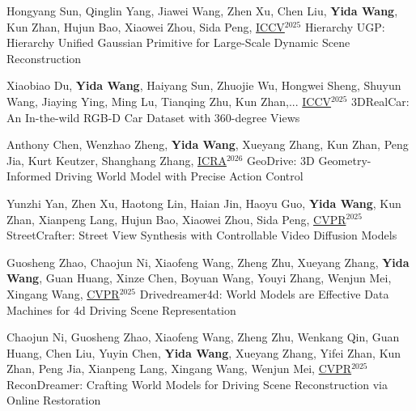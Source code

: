 \begin{cventries}
\begin{enumerate}[label={[\arabic*]}, leftmargin=*]
\item
\cvpublication
{Hongyang Sun, Qinglin Yang, Jiawei Wang, Zhen Xu, Chen Liu, \textbf{Yida Wang}, Kun Zhan, Hujun Bao, Xiaowei Zhou, Sida Peng, \underline{ICCV}$^{2025}$} %
{Hierarchy UGP: Hierarchy Unified Gaussian Primitive for Large-Scale Dynamic Scene Reconstruction} %
{} %
{} %

\item
\cvpublication
{Xiaobiao Du, \textbf{Yida Wang}, Haiyang Sun, Zhuojie Wu, Hongwei Sheng, Shuyun Wang, Jiaying Ying, Ming Lu, Tianqing Zhu, Kun Zhan,...  \underline{ICCV}$^{2025}$} %
{3DRealCar: An In-the-wild RGB-D Car Dataset with 360-degree Views} %
{} %
{} %

\item
\cvpublication
{Anthony Chen, Wenzhao Zheng, \textbf{Yida Wang}, Xueyang Zhang, Kun Zhan, Peng Jia, Kurt Keutzer, Shanghang Zhang, \underline{ICRA}$^{2026}$} %
{GeoDrive: 3D Geometry-Informed Driving World Model with Precise Action Control} %
{} %
{} %

\item
\cvpublication
{Yunzhi Yan, Zhen Xu, Haotong Lin, Haian Jin, Haoyu Guo, \textbf{Yida Wang}, Kun Zhan, Xianpeng Lang, Hujun Bao, Xiaowei Zhou, Sida Peng, \underline{CVPR}$^{2025}$} %
{StreetCrafter: Street View Synthesis with Controllable Video Diffusion Models} %
{} %
{} %

\item
\cvpublication
{Guosheng Zhao, Chaojun Ni, Xiaofeng Wang, Zheng Zhu, Xueyang Zhang, \textbf{Yida Wang}, Guan Huang, Xinze Chen, Boyuan Wang, Youyi Zhang, Wenjun Mei, Xingang Wang, \underline{CVPR}$^{2025}$} %
{Drivedreamer4d: World Models are Effective Data Machines for 4d Driving Scene Representation} %
{} %
{} %

\item
\cvpublication
{Chaojun Ni, Guosheng Zhao, Xiaofeng Wang, Zheng Zhu, Wenkang Qin, Guan Huang, Chen Liu, Yuyin Chen, \textbf{Yida Wang}, Xueyang Zhang, Yifei Zhan, Kun Zhan, Peng Jia, Xianpeng Lang, Xingang Wang, Wenjun Mei, \underline{CVPR}$^{2025}$} %
{ReconDreamer: Crafting World Models for Driving Scene Reconstruction via Online Restoration} %
{} %
{} %



\end{enumerate}
\end{cventries}
